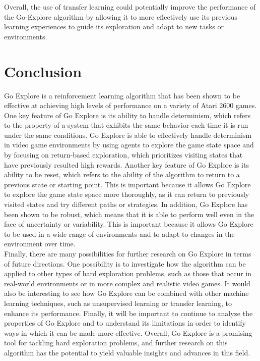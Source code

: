 \documentclass[runningheads]{llncs}%
\begin{document}
Overall, the use of transfer learning could potentially improve the performance of the Go-Explore algorithm by allowing it to more effectively use its previous learning experiences to guide its exploration and adapt to new tasks or environments.


\section{Conclusion}
Go Explore is a reinforcement learning algorithm that has been shown to be effective at achieving high levels of performance on a variety of Atari 2600 games. One key feature of Go Explore is its ability to handle determinism, which refers to the property of a system that exhibits the same behavior each time it is run under the same conditions. Go Explore is able to effectively handle determinism in video game environments by using agents to explore the game state space and by focusing on return-based exploration, which prioritizes visiting states that have previously resulted high rewards. Another key feature of Go Explore is its ability to be reset, which refers to the ability of the algorithm to return to a previous state or starting point. This is important because it allows Go Explore to explore the game state space more thoroughly, as it can return to previously visited states and try different paths or strategies. In addition, Go Explore has been shown to be robust, which means that it is able to perform well even in the face of uncertainty or variability. This is important because it allows Go Explore to be used in a wide range of environments and to adapt to changes in the environment over time.\\

Finally, there are many possibilities for further research on Go Explore in terms of future directions. One possibility is to investigate how the algorithm can be applied to other types of hard exploration problems, such as those that occur in real-world environments or in more complex and realistic video games. It would also be interesting to see how Go Explore can be combined with other machine learning techniques, such as unsupervised learning or transfer learning, to enhance its performance. Finally, it will be important to continue to analyze the properties of Go Explore and to understand its limitations in order to identify ways in which it can be made more effective. Overall, Go Explore is a promising tool for tackling hard exploration problems, and further research on this algorithm has the potential to yield valuable insights and advances in this field.

\begingroup
\renewcommand{\clearpage}{}
\ \par
\renewcommand{\bibpreamble}{\vspace{-.5cm}}

\endgroup
\end{document}
